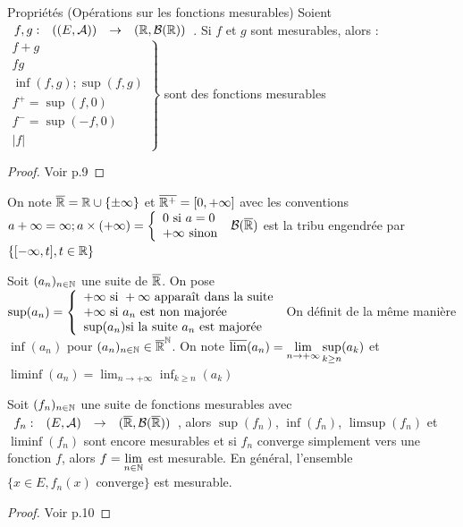\documentclass[]{report}
\begin{document}
\begin{prop}{Propriétés (Opérations sur les fonctions mesurables)}{}
    Soient $\begin{array}{ccccc} f,g : & ((E,\mathcal{A})) & \to & (\mathbb{R},\mathcal{B}(\mathbb{R})) \end{array}$.
    Si $f$ et $g$ sont mesurables, alors :
    $\left.\begin{array}{ll}
    f+g\\
    fg\\
    \inf(f,g);\sup(f,g)\\
    f^+=\sup(f,0)\\
    f^-=\sup(-f,0)\\
    |f|
    \end{array} \right\}$ sont des fonctions mesurables
\end{prop}

\begin{proof}{}{}
    Voir p.9
\end{proof}

\begin{df}{}{}
    On note $\overline{\mathbb{R}}=\mathbb{R}\cup\{\pm\infty\}$ et $\overline{\mathbb{R}^+}=[0,+\infty]$ avec les conventions $a+\infty=\infty;a\times(+\infty)=\left\{\begin{array}{ll} 0\text{ si }a=0\\
    +\infty\text{ sinon} \end{array} \right.$
    $\mathcal{B}(\overline{\mathbb{R}})$ est la tribu engendrée par $\{[-\infty,t],t\in\mathbb{R}\}$
\end{df}

\begin{df}{}{}
    Soit $(a_n)_{{n\in\mathbb{N}}}$ une suite de $\overline{\mathbb{R}}$. On pose $\sup(a_n)=\left\{\begin{array}{ll} +\infty\text{ si }+\infty\text{ apparaît dans la suite}\\
    +\infty\text{ si } a_n \text{ est non majorée}\\
    \sup (a_n)\text{si la suite }a_n\text{ est majorée} \end{array} \right.$
    On définit de la même manière $\inf(a_n)$ pour $(a_n)_{{n\in\mathbb{N}}}\in\overline{\mathbb{R}}^{\mathbb{N}}$.
    On note $\displaystyle{\overline{\lim}(a_n)=\lim_{n\to+\infty}\sup_{k\ge n}(a_k)}$ et $\displaystyle{\liminf(a_n)=\lim_{n\to+\infty}\inf_{k\ge n}(a_k)}$
\end{df}

\begin{prop}{}{}
    Soit $(f_n)_{{n\in\mathbb{N}}}$ une suite de fonctions mesurables avec $\begin{array}{ccccc} f_n : & (E,\mathcal{A}) & \to & (\overline{\mathbb{R}},\mathcal{B}(\overline{\mathbb{R}})) \end{array}$, alors $\sup(f_n)$, $\inf(f_n)$, $\limsup(f_n)$ et $\liminf(f_n)$ sont encore mesurables et si $f_n$ converge simplement vers une fonction $f$, alors $\displaystyle{f=\lim_{{n\in\mathbb{N}}}}$ est mesurable. En général, l'ensemble $\{x\in E,f_n(x)\text{ converge}\}$ est mesurable.
\end{prop}

\begin{proof}{}{}
    Voir p.10
\end{proof}
\end{document}

